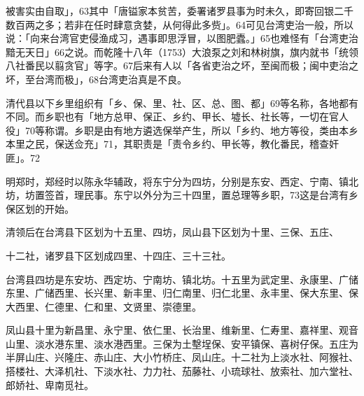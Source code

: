 \noindent 被害实由自取」，63其中「唐镒家本贫苦，委署诸罗县事为时未久，即寄回银二千数百两之多；若非在任时肆意贪婪，从何得此多赀」。64可见台湾吏治一般，所以说：「向来台湾官吏侵渔成习，遇事即思浮冒，以图肥蠹。」65也难怪有「台湾吏治黯无天日」66之说。而乾隆十八年（1753）大浪泵之刘和林树旗，旗内就书「统领八社番民以翦贪官」等字。67后来有人以「各省吏治之坏，至闽而极；闽中吏治之坏，至台湾而极」，68台湾吏治真是不良。


清代县以下乡里组织有「乡、保、里、社、区、总、图、都」69等名称，各地都有不同。而乡职也有「地方总甲、保正、乡约、甲长、墟长、社长等，一切在官人役」70等称谓。乡职是由有地方遴选保举产生，所以「乡约、地方等役，类由本乡本里之民，保送佥充」71，其职责是「责令乡约、甲长等，教化番民，稽查奸匪」。72


明郑时，郑经时以陈永华辅政，将东宁分为四坊，分别是东安、西定、宁南、镇北坊，坊置签首，理民事。东宁以外分为三十四里，置总理等乡职，73这是台湾有乡保区划的开始。

清领后在台湾县下区划为十五里、四坊，凤山县下区划为十里、三保、五庄、

\vfill
\begin{BookNotes}
\end{BookNotes}

\noindent 十二社，诸罗县下区划成四里、十四庄、三十三社。

台湾县四坊是东安坊、西定坊、宁南坊、镇北坊。十五里为武定里、永康里、广储东里、广储西里、长兴里、新丰里、归仁南里、归仁北里、永丰里、保大东里、保大西里、仁德里、仁和里、文贤里、崇德里。

凤山县十里为新昌里、永宁里、依仁里、长治里、维新里、仁寿里、嘉祥里、观音山里、淡水港东里、淡水港西里。三保为土墼埕保、安平镇保、喜树仔保。五庄为半屏山庄、兴隆庄、赤山庄、大小竹桥庄、凤山庄。十二社为上淡水社、阿猴社、搭楼社、大泽机社、下淡水社、力力社、茄藤社、小琉球社、放索社、加六堂社、郎娇社、卑南觅社。


